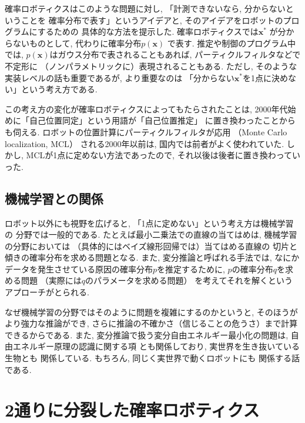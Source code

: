 \documentclass[twocolumn]{jarticle} %
\newcommand{\V}[1]{\boldsymbol{#1}}
\begin{document}


確率ロボティクスはこのような問題に対し, 
「計測できないなら, 分からないということを
確率分布で表す」というアイデアと, 
そのアイデアをロボットのプログラムにするための
具体的な方法を提示した\cite{thrun2005,上田2019}. 
確率ロボティクスでは$\V{x}^*$
が分からないものとして, 代わりに確率分布$p(\V{x})$
で表す. 推定や制御のプログラム中では, 
$p(\V{x})$はガウス分布で表されることもあれば, 
パーティクルフィルタ\cite{fox1999}などで不定形に
（ノンパラメトリックに）表現されることもある. 
ただし, そのような実装レベルの話も重要であるが, 
より重要なのは
「分からない$\V{x}^*$を1点に決めない」という考え方である. 

この考え方の変化が確率ロボティクスによってもたらされたことは, 
2000年代始めに「自己位置同定」という用語が「自己位置推定」
に置き換わったことからも伺える. 
ロボットの位置計算にパーティクルフィルタが応用
（Monte Carlo localization, MCL\cite{fox1999}）
される2000年以前は, 国内では前者がよく使われていた. 
しかし, MCLが1点に定めない方法であったので, 
それ以後は後者に置き換わっていった. 

\subsection{機械学習との関係}

ロボット以外にも視野を広げると, 
「1点に定めない」という考え方は機械学習の
分野では一般的である\cite{bishop2006}. 
たとえば最小二乗法での直線の当てはめは, 
機械学習の分野においては
（具体的にはベイズ線形回帰では）当てはめる直線の
切片と傾きの確率分布を求める問題となる. 
また, 変分推論と呼ばれる手法では, 
なにかデータを発生させている原因の確率分布$p$を推定するために, 
$p$の確率分布$q$を求める問題
（実際には$q$のパラメータを求める問題）
を考えてそれを解くというアプローチがとられる. 

なぜ機械学習の分野ではそのように問題を複雑にするのかというと, 
そのほうがより強力な推論ができ, 
さらに推論の不確かさ（信じることの危うさ）まで計算できるからである. 
また, 変分推論で扱う変分自由エネルギー最小化の問題は, 
自由エネルギー原理\cite{乾2021}の認識に関する項
とも関係しており, 実世界を生き抜いている生物とも
関係している. もちろん, 同じく実世界で動くロボットにも
関係する話である. 


\section{2通りに分裂した確率ロボティクス}
\end{document}
